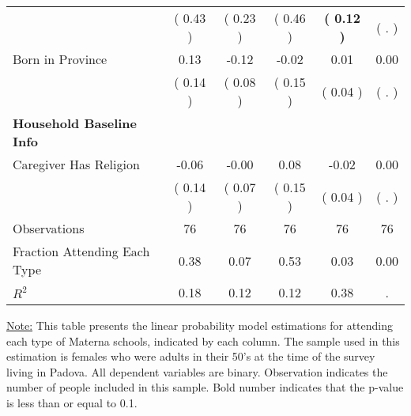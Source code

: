 \begin{table}[H]
{\begin{tabular}{lccccc}
\quad  & (     0.43 ) & (     0.23 )  & (     0.46 )  & \textbf{(     0.12 )} & (        . ) \\
\quad Born in Province &      0.13 &     -0.12 &     -0.02 &      0.01 &      0.00 \\
\quad  & (     0.14 ) & (     0.08 )  & (     0.15 )  & (     0.04 ) & (        . ) \\
\midrule
\textbf{Household Baseline Info} \\
\quad Caregiver Has Religion &     -0.06 &     -0.00 &      0.08 &     -0.02 &      0.00 \\
\quad  & (     0.14 ) & (     0.07 )  & (     0.15 )  & (     0.04 ) & (        . ) \\
\midrule
Observations & 76 & 76 & 76 & 76 & 76 \\
Fraction Attending Each Type &      0.38 &      0.07 &      0.53 &      0.03 &      0.00 \\
\midrule
$ R^2$ &      0.18 &      0.12 &      0.12 &      0.38 &         . \\
\bottomrule
\end{tabular}}
\end{table}
\begin{footnotesize}
\noindent\underline{Note:} This table presents the linear probability model estimations for attending each type of Materna schools, indicated by each column. The sample used in this estimation is females who were adults in their 50's at the time of the survey living in Padova. All dependent variables are binary. Observation indicates the number of people included in this sample. Bold number indicates that the p-value is less than or equal to 0.1.
\end{footnotesize}
